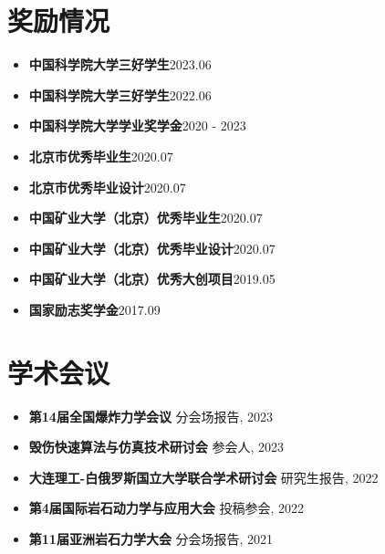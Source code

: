 \documentclass[a4paper,12pt]{extarticle}
\begin{document}
\section*{奖励情况}
\begin{itemize}
    \item \textbf{中国科学院大学三好学生}\hfill 2023.06  
    \item \textbf{中国科学院大学三好学生}\hfill 2022.06  
    \item \textbf{中国科学院大学学业奖学金}\hfill 2020 - 2023  
    \item \textbf{北京市优秀毕业生}\hfill 2020.07
    \item \textbf{北京市优秀毕业设计}\hfill 2020.07  
    \item \textbf{中国矿业大学（北京）优秀毕业生}\hfill 2020.07  
    \item \textbf{中国矿业大学（北京）优秀毕业设计}\hfill 2020.07  
    \item \textbf{中国矿业大学（北京）优秀大创项目}\hfill 2019.05  
    \item \textbf{国家励志奖学金}\hfill 2017.09  
\end{itemize}

\section*{学术会议}
\begin{itemize}
    \item \textbf{第14届全国爆炸力学会议} \hfill 分会场报告, 2023  
    \item \textbf{毁伤快速算法与仿真技术研讨会} \hfill 参会人, 2023  
    \item \textbf{大连理工-白俄罗斯国立大学联合学术研讨会} \hfill 研究生报告, 2022 
    \item \textbf{第4届国际岩石动力学与应用大会} \hfill 投稿参会, 2022 
    \item \textbf{第11届亚洲岩石力学大会} \hfill 分会场报告, 2021 
\end{itemize}

\end{document}
